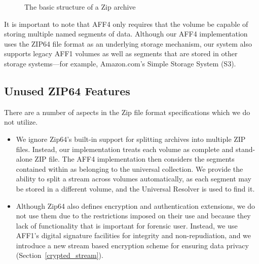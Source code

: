 \documentclass[10pt, conference]{IEEEtran}
\begin{document}
\begin{figure}[]
  \begin{center}
  \mbox{\columnwidth {}}
  \caption{The basic structure of a Zip archive}
  \label{zip_structure}
  \end{center}
\end{figure}

It is important to note that AFF4 only requires that the volume be
capable of storing multiple named segments of data. Although our AFF4
implementation uses the ZIP64 file format as an underlying storage
mechanism, our system also supports legacy AFF1 volumes as well as
segments that are stored in other storage systems---for example,
Amazon.com's Simple Storage System (S3)\cite{s2-aws-home-page-money}.

\subsection{Unused ZIP64 Features}
There are a number of aspects in the Zip file format specifications
which we do not utilize.
\begin{itemize}
\item We ignore Zip64's built-in support for splitting
archives into multiple ZIP files. Instead, our implementation treats
each volume as complete and stand-alone ZIP file. The AFF4
implementation then considers the segments contained within as
belonging to the universal collection. We provide the ability to split
a stream across volumes automatically, as each segment may be stored
in a different volume, and the Universal Resolver is used to find it.

\item Although Zip64 also defines encryption and authentication
extensions, we do not use them due to the restrictions imposed on
their use and because they lack of functionality that is important for
forensic user. Instead, we use AFF1's digital signature facilities for
integrity and non-repudiation, and we introduce a new stream based
encryption scheme for ensuring data privacy
(Section~\ref{crypted_stream}).

\end{itemize}


\end{document}
